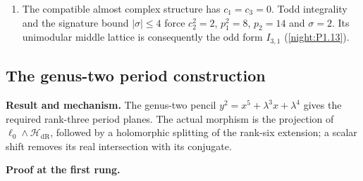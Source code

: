 \documentclass[11pt,a4paper]{article}
\theoremstyle{definition}
\newcommand{\RungZero}[1]{\par\noindent\textbf{Result and mechanism.} #1\par\smallskip}
\newcommand{\RungOne}{\par\Needspace{6\baselineskip}\noindent\textbf{Proof at the first rung.}\par\nobreak\smallskip}
\begin{document}
\begin{enumerate}[label=\arabic*.]
  $\mathbb Z/2$.  On the cusp term $\mathbb Z\oplus\mathbb Z/2$,
  the remaining kernel is generated by $(1,\epsilon)$, where
  $\epsilon$ is the image of its free generator.
  The Leray filtration therefore gives $H^3=0$ and
  $H^4=\mathbb Z^4$.  Universal coefficients, duality and
  Hurewicz give the asserted free homology and three-connectivity
  (\cref{maps:src:F.2.6}, item~6; \cref{night:P1.12}).
\item The compatible almost complex structure has $c_1=c_3=0$.
  Todd integrality and the signature bound $|\sigma|\leq4$ force
  $c_2^2=2$, $p_1^2=8$, $p_2=14$ and $\sigma=2$.
  Its unimodular middle lattice is consequently the odd form
  $I_{3,1}$ (\cref{night:P1.13}).
\end{enumerate}

\subsection{The genus-two period construction}
\RungZero{The genus-two pencil
$y^2=x^5+\lambda^3x+\lambda^4$ gives the required rank-three period
planes.  The actual morphism is the projection of
$\ell_0\wedge\mathcal H_{\mathrm{dR}}$, followed by a holomorphic
splitting of the rank-six extension; a scalar shift removes its real
intersection with its conjugate.}
\RungOne
\end{document}

